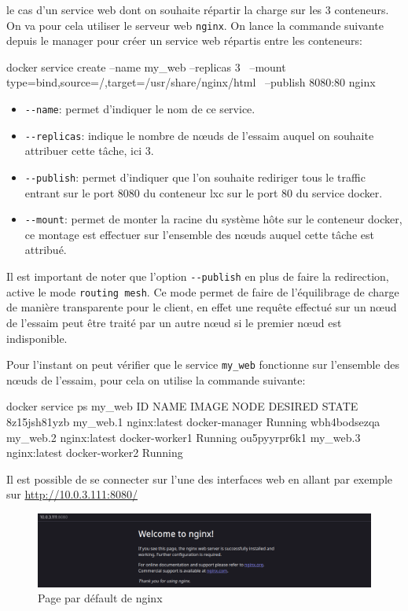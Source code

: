 le cas d'un service web dont on souhaite répartir la charge sur les 3 conteneurs. On va pour cela
utiliser le serveur web \verb:nginx:. On lance la commande suivante depuis le manager 
pour créer un service web répartis entre les conteneurs:
\begin{bash}
docker service create --name my_web --replicas 3 \
    --mount type=bind,source=/,target=/usr/share/nginx/html \
    --publish 8080:80 nginx
\end{bash}
\begin{itemize}
    \item \verb:--name:: permet d'indiquer le nom de ce service.
    \item \verb:--replicas:: indique le nombre de nœuds de l'essaim auquel on souhaite
        attribuer cette tâche, ici 3.
    \item \verb:--publish:: permet d'indiquer que l'on souhaite rediriger tous le traffic 
        entrant sur le port 8080 du conteneur lxc sur le port 80 du service docker.  
    \item \verb:--mount:: permet de monter la racine du système hôte sur le conteneur
        docker, ce montage est effectuer sur l'ensemble des nœuds auquel cette tâche 
        est attribué.
\end{itemize}
Il est important de noter que l'option \verb:--publish: en plus de faire la redirection,
active le mode \verb:routing mesh:. Ce mode permet de faire de l'équilibrage de charge de
manière transparente pour le client, en effet une requête effectué sur un nœud de l'essaim 
peut être traité par un autre nœud si le premier nœud est indisponible.\newline 

Pour l'instant on peut vérifier que le service \verb:my_web: fonctionne sur l'ensemble des
nœuds de l'essaim, pour cela on utilise la commande suivante:
\begin{bash}
docker service ps my_web
ID           NAME     IMAGE        NODE           DESIRED STATE
8z15jsh81yzb my_web.1 nginx:latest docker-manager Running      
wbh4bodsezqa my_web.2 nginx:latest docker-worker1 Running      
ou5pyyrpr6k1 my_web.3 nginx:latest docker-worker2 Running       
\end{bash}
\newpage

Il est possible de se connecter sur l'une des interfaces web en allant par exemple sur 
\url{http://10.0.3.111:8080/}

\begin{figure}[h!]
    \centering
    \includegraphics[width=\textwidth]{img/nginx}
    \caption{Page par défault de nginx}
\end{figure}

